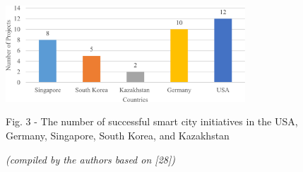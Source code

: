 \begin{figure}[H]
	\centering
	\includegraphics[width=0.8\textwidth]{media/ekon/Graph_14}
	\caption*{Fig. 3 - The number of successful smart city initiatives in the USA, Germany, Singapore, South Korea, and Kazakhstan}
	\caption*{\normalfont \emph{(compiled by the authors based on {[}28{]})}} 
\end{figure}

